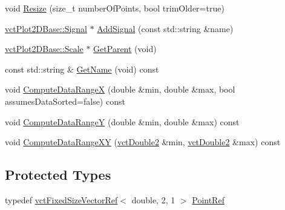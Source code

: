 \begin{DoxyCompactItemize}
\item 
void \hyperlink{classvct_plot2_d_base_1_1_signal_a2614ca9ee337428ef780788f94a50474}{Resize} (size\+\_\+t number\+Of\+Points, bool trim\+Older=true)
\item 
\hyperlink{classvct_plot2_d_base_1_1_signal}{vct\+Plot2\+D\+Base\+::\+Signal} $\ast$ \hyperlink{classvct_plot2_d_base_1_1_signal_ac3b25683c0fc73be0851daa0a8601693}{Add\+Signal} (const std\+::string \&name)
\item 
\hyperlink{classvct_plot2_d_base_1_1_scale}{vct\+Plot2\+D\+Base\+::\+Scale} $\ast$ \hyperlink{classvct_plot2_d_base_1_1_signal_ad5ad5a5ac33cbdb3d258260419a62af5}{Get\+Parent} (void)
\item 
const std\+::string \& \hyperlink{classvct_plot2_d_base_1_1_signal_a876661f9df487814fc833a76ec849606}{Get\+Name} (void) const 
\end{DoxyCompactItemize}
{\bf }\par
\begin{DoxyCompactItemize}
\item 
void \hyperlink{classvct_plot2_d_base_1_1_signal_ad3c405fcaf31f7af60b4c0fdabc6006b}{Compute\+Data\+Range\+X} (double \&min, double \&max, bool assumes\+Data\+Sorted=false) const 
\item 
void \hyperlink{classvct_plot2_d_base_1_1_signal_a59133a2bee2795a8931bcc8f2cac96a1}{Compute\+Data\+Range\+Y} (double \&min, double \&max) const 
\item 
void \hyperlink{classvct_plot2_d_base_1_1_signal_a16f1ed79c4dde3cec730c324be029f42}{Compute\+Data\+Range\+X\+Y} (\hyperlink{vct_fixed_size_vector_types_8h_afc0fdcc41cbe8b043747612501610812}{vct\+Double2} \&min, \hyperlink{vct_fixed_size_vector_types_8h_afc0fdcc41cbe8b043747612501610812}{vct\+Double2} \&max) const 
\end{DoxyCompactItemize}

\subsection*{Protected Types}
\begin{DoxyCompactItemize}
\item 
typedef \hyperlink{classvct_fixed_size_vector_ref}{vct\+Fixed\+Size\+Vector\+Ref}$<$ double, 2, 1 $>$ \hyperlink{classvct_plot2_d_base_1_1_signal_a81b636c91281333319b7f806b8432b92}{Point\+Ref}
\end{DoxyCompactItemize}
